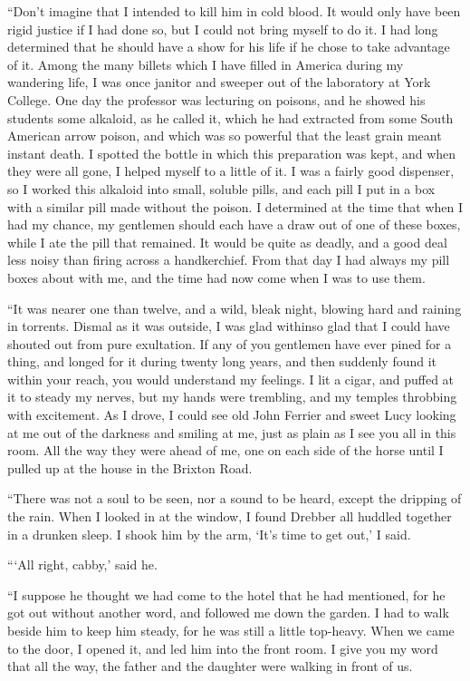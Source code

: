 \documentclass[12pt,english]{book}
\begin{document}
{}``Don't imagine that I intended to kill him in cold blood. It would
only have been rigid justice if I had done so, but I could not bring
myself to do it. I had long determined that he should have a show
for his life if he chose to take advantage of it. Among the many billets
which I have filled in America during my wandering life, I was once
janitor and sweeper out of the laboratory at York College. One day
the professor was lecturing on poisons, and he showed his students
some alkaloid, as he called it, which he had extracted from some South
American arrow poison, and which was so powerful that the least grain
meant instant death. I spotted the bottle in which this preparation
was kept, and when they were all gone, I helped myself to a little
of it. I was a fairly good dispenser, so I worked this alkaloid into
small, soluble pills, and each pill I put in a box with a similar
pill made without the poison. I determined at the time that when I
had my chance, my gentlemen should each have a draw out of one of
these boxes, while I ate the pill that remained. It would be quite
as deadly, and a good deal less noisy than firing across a handkerchief.
From that day I had always my pill boxes about with me, and the time
had now come when I was to use them.

{}``It was nearer one than twelve, and a wild, bleak night, blowing
hard and raining in torrents. Dismal as it was outside, I was glad
within\mdsh{---}so glad that I could have shouted out from pure exultation.
If any of you gentlemen have ever pined for a thing, and longed for
it during twenty long years, and then suddenly found it within your
reach, you would understand my feelings. I lit a cigar, and puffed
at it to steady my nerves, but my hands were trembling, and my temples
throbbing with excitement. As I drove, I could see old John Ferrier
and sweet Lucy looking at me out of the darkness and smiling at me,
just as plain as I see you all in this room. All the way they were
ahead of me, one on each side of the horse until I pulled up at the
house in the Brixton Road.

{}``There was not a soul to be seen, nor a sound to be heard, except
the dripping of the rain. When I looked in at the window, I found
Drebber all huddled together in a drunken sleep. I shook him by the
arm, `It's time to get out,' I said.

{}```All right, cabby,' said he.

{}``I suppose he thought we had come to the hotel that he had mentioned,
for he got out without another word, and followed me down the garden.
I had to walk beside him to keep him steady, for he was still a little
top-heavy. When we came to the door, I opened it, and led him into
the front room. I give you my word that all the way, the father and
the daughter were walking in front of us.
\end{document}
